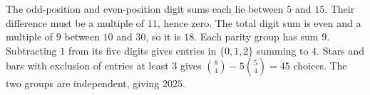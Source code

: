 The odd-position and even-position digit sums each lie between $5$ and $15$. Their difference must be a multiple of $11$, hence zero. The total digit sum is even and a multiple of $9$ between $10$ and $30$, so it is $18$. Each parity group has sum $9$. Subtracting $1$ from its five digits gives entries in $\{0,1,2\}$ summing to $4$. Stars and bars with exclusion of entries at least $3$ gives $\binom84-5\binom54=45$ choices. The two groups are independent, giving $\boxed{2025}$.
